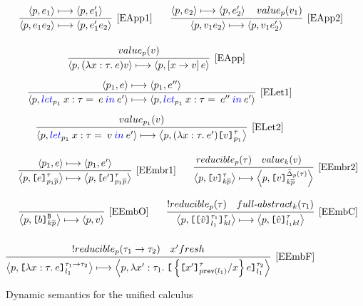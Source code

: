 \documentclass{article}
\newcommand{\emb}[3]{\texttt{[}#1\texttt{]}_{#2}^{#3}}
\newcommand{\tslam}[3]{\lambda #1 : #2. \: #3}
\newcommand{\plet}[5]{\textcolor[rgb]{0,0,1}{let}_{#1} \: {#2}:{#3} = \: #4 \: \textcolor[rgb]{0,0,1}{in} \: #5}
\newcommand{\eval}[2]{\left\langle {#1},{#2} \right\rangle}
\newcommand\rulename[1]{\mathrm{\text{[#1]}}}
\begin{document}
\begin{figure}[!htbp]
\[
\begin{tabular}{c c}
\infer[\rulename{EApp1}] 
{\eval{p}{e_1 e_2} \longmapsto  \eval{p}{e_1' e_2}}
{\eval{p}{e_1} \longmapsto  \eval{p}{e_1'}} & 

\infer[\rulename{EApp2}] 
{\eval{p}{v_1 e_2} \longmapsto  \eval{p}{v_1 e_2'}}
{\eval{p}{e_2} \longmapsto  \eval{p}{e_2'}  \quad value_p(v_1)} 
\end{tabular}
\]
\[
\infer[\rulename{EApp}] 
{\eval{p}{(\tslam{x}{\tau}{e}) v} \longmapsto  \eval{p}{\left[ x \rightarrow v \right] e}}
{value_p(v)}
\]
\[
\renewcommand{\arraystretch}{3}
\begin{tabular}{c}
\infer[\rulename{ELet1}] 
{\eval{p}{\plet{p_1}{x}{\tau}{e}{e'}} \longmapsto  \eval{p}{\plet{p_1}{x}{\tau}{e''}{e'}}}
{\eval{p_1}{e} \longmapsto  \eval{p_1}{e''}} \\

\infer[\rulename{ELet2}] 
{\eval{p}{\plet{p_1}{x}{\tau}{v}{e'}} \longmapsto  \eval{p}{(\tslam{x}{\tau}{e'})\emb{v}{p_1}{\tau}}}
{ value_{p_1}(v) } 
\end{tabular}
\]
\[
\begin{tabular}{c c}
\infer[\rulename{EEmbr1}] 
{\eval{p}{\emb{e}{p_1 \overline{p}}{\tau}} \longmapsto  \eval{p}{\emb{e'}{p_1 \overline{p}}{\tau}}}
{\eval{p_1}{e} \longmapsto  \eval{p_1}{e'}} & 

\infer[\rulename{EEmbr2}] 
{\eval{p}{\emb{v}{k\overline{p}}{\tau}} \longmapsto  \eval{p}{\emb{v}{k\overline{p}}{\bar{\Delta}_p(\tau)}}}
{reducible_p(\tau) \quad value_k(v) \quad}  
\end{tabular}
\]
\[
\renewcommand{\arraystretch}{3}
\begin{tabular}{c c}
\infer[\mathrm{[EEmbO]}] 
{\eval{p}{\emb{b}{k\overline{p}}{\texttt{B}}} \longmapsto  \eval{p}{v}}
{} &
\infer[\mathrm{[EEmbC]}] 
{\eval{p}{\emb{\emb{\hat{v}}{l_1}{\tau_1}}{kl}{\tau}} \longmapsto  \eval{p}{\emb{\hat{v}}{l_1 k l}{\tau}}}
{!reducible_p(\tau)  \quad full\text{-}abstract_k(\tau_1)}
\end{tabular}
\] 

\[
\infer[\mathrm{[EEmbF]}] 
{\eval{p}{\emb{\tslam{x}{\tau}{e}}{l_1}{\tau_1 \rightarrow \tau_2}} \longmapsto  
 \eval{p}{\tslam{x'}{\tau_1}{\emb{\left\{\emb{x'}{p \texttt{rev}(l_1)}{\tau}/x  \right\} e}{l_1}{\tau_2}}}}
{!reducible_p(\tau_1 \rightarrow \tau_2) \quad x' fresh}
\] 

\caption{Dynamic semantics for the unified calculus}
		\label{fig:unified_dynamic-semantics_multi-agent}
	\end{figure}
\end{document}
